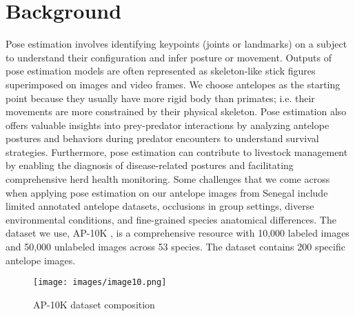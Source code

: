 \documentclass[conference]{IEEEtran}
\begin{document}
\section{Background}
Pose estimation involves identifying keypoints (joints or landmarks) on a subject to understand their configuration and infer posture or movement.
Outputs of pose estimation models are often represented as skeleton-like stick figures superimposed on images and video frames.
We choose antelopes as the starting point because they usually have more rigid body than primates; i.e. their movements are more constrained by their physical skeleton.
Pose estimation also offers valuable insights into prey-predator interactions by analyzing antelope postures and behaviors during predator encounters to understand survival strategies.
Furthermore, pose estimation can contribute to livestock management by enabling the diagnosis of disease-related postures and facilitating comprehensive herd health monitoring.
Some challenges that we come across when applying pose estimation on our antelope images from Senegal include limited annotated antelope datasets, occlusions in group settings, diverse environmental conditions, and fine-grained species anatomical differences.
The dataset we use, AP-10K \cite{AP10K}, is a comprehensive resource with 10,000 labeled images and 50,000 unlabeled images across 53 species.
The dataset contains 200 specific antelope images.

\begin{figure}[htbp]
    \centerline{\texttt{[image: images/image10.png]}}
    \caption{AP-10K dataset composition}
    \label{fig:example}
\end{figure}
\end{document}
